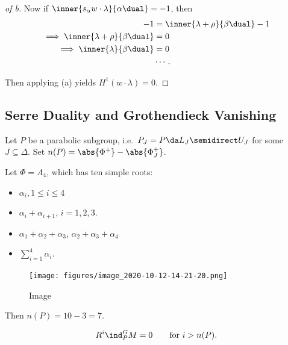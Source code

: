 \begin{proof}[of b]
Now if \(\inner{s_\alpha w \cdot \lambda}{\alpha\dual} = -1\), then
\begin{align*}  
-1 &= \inner{\lambda + \rho}{\beta\dual} - 1 \\
\implies \inner{\lambda + \rho}{\beta\dual} &= 0 \\
\implies \inner{\lambda}{\beta\dual} &= 0 \\
& \cdots
.\end{align*}


Then applying (a) yields \(H^1(w\cdot \lambda) = 0\).

\end{proof}

\hypertarget{serre-duality-and-grothendieck-vanishing}{%
\subsection{Serre Duality and Grothendieck
Vanishing}\label{serre-duality-and-grothendieck-vanishing}}

Let \(P\) be a parabolic subgroup,
i.e.~\(P_J = P \da L_J \semidirect U_J\) for some \(J\subseteq \Delta\).
Set \(n(P) = \abs{\Phi^+} - \abs{\Phi^+_J}\).

\begin{example}

Let \(\Phi = A_4\), which has ten simple roots:

\begin{itemize}
\tightlist
\item
  \(\alpha_i, 1\leq i \leq 4\)
\item
  \(\alpha_i + \alpha_{i+1}\), \(i=1,2,3\).
\item
  \(\alpha_1 + \alpha_2 +\alpha_3\), \(\alpha_2 + \alpha_3 + \alpha_4\)
\item
  \(\sum_{i=1}^4 \alpha_i\).
\end{itemize}

\begin{figure}
\centering
\texttt{[image: figures/image\_2020-10-12-14-21-20.png]}
\caption{Image}
\end{figure}

Then \(n(P) = 10 - 3 = 7\).

\end{example}

\begin{theorem}

\begin{align*}  
R^i \ind_P^G M = 0 \qquad \text{for } i > n(P)
.\end{align*}

\end{theorem}


